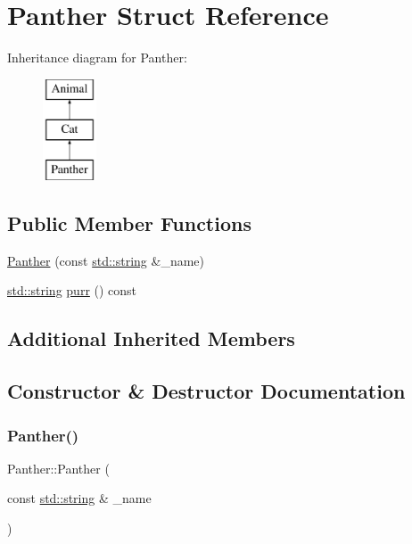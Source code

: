 \hypertarget{struct_panther}{}\section{Panther Struct Reference}
\label{struct_panther}
Inheritance diagram for Panther\+:\begin{figure}[H]
\begin{center}
\leavevmode
\includegraphics[height=3.000000cm]{struct_panther}
\end{center}
\end{figure}
\subsection*{Public Member Functions}
\begin{DoxyCompactItemize}
\item 
\mbox{\hyperlink{struct_panther_ae935dc0f8858456ba3765befc1d487d6}{Panther}} (const \mbox{\hyperlink{_s_d_l__opengl__glext_8h_ab4ccfaa8ab0e1afaae94dc96ef52dde1}{std\+::string}} \&\+\_\+name)
\item 
\mbox{\hyperlink{_s_d_l__opengl__glext_8h_ab4ccfaa8ab0e1afaae94dc96ef52dde1}{std\+::string}} \mbox{\hyperlink{struct_panther_a0756bef5d80ad22cf5a65476a7c4036e}{purr}} () const
\end{DoxyCompactItemize}
\subsection*{Additional Inherited Members}


\subsection{Constructor \& Destructor Documentation}
\mbox{\label{struct_panther_ae935dc0f8858456ba3765befc1d487d6}} 
\subsubsection{\texorpdfstring{Panther()}{Panther()}}
{\footnotesize\ttfamily Panther\+::\+Panther (\begin{DoxyParamCaption}\item[{const \mbox{\hyperlink{_s_d_l__opengl__glext_8h_ab4ccfaa8ab0e1afaae94dc96ef52dde1}{std\+::string}} \&}]{\+\_\+name }\end{DoxyParamCaption})\hspace{0.3cm}{\ttfamily [inline]}}



